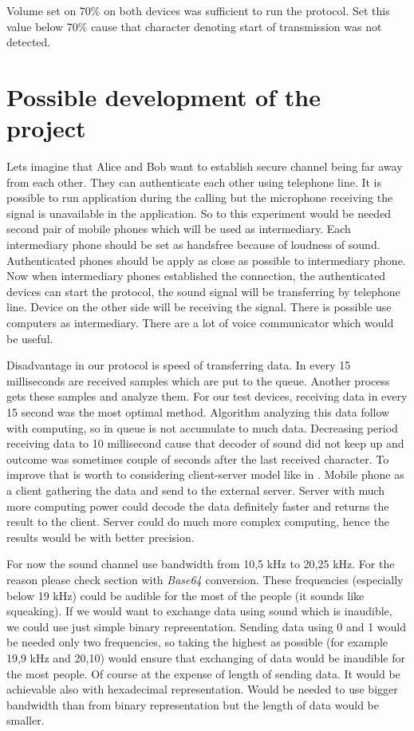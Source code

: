 \documentclass[11pt,titlepage]{article}
\theoremstyle{plain}
\begin{document}
Volume set on 70\% on both devices was sufficient to run the protocol. Set this value below 70\% cause that character denoting start of transmission was not detected.

\section{Possible development of the project}
Lets imagine that Alice and Bob want to establish secure channel being far away from each other. They can authenticate each other using telephone line. It is possible to run application during the calling but the microphone receiving the signal is unavailable in the application. So to this experiment would be needed second pair of mobile phones which will be used as intermediary. Each intermediary phone should be set as handsfree because of loudness of sound. Authenticated phones should be apply as close as possible to intermediary phone. Now when intermediary phones established the connection, the authenticated devices can start the protocol, the sound signal will be transferring by telephone line. Device on the other side will be receiving the signal. There is possible use computers as intermediary. There are a lot of voice communicator which would be useful.

\vspace{5mm}

Disadvantage in our protocol is speed of transferring data. In every 15 milliseconds are received samples which are put to the queue. Another process gets these samples and analyze them. For our test devices, receiving data in every 15 second was the most optimal method. Algorithm analyzing this data follow with computing, so in queue is not accumulate to much data. Decreasing period receiving data to 10 millisecond cause that decoder of sound did not keep up and outcome was sometimes couple of seconds after the last received character. To improve that is worth to considering client-server model like in \cite{chirp}. Mobile phone as a client gathering the data and send to the external server. Server with much more computing power could decode the data definitely faster and returns the result to the client. Server could do much more complex computing, hence the results would be with better precision.

\vspace{5mm}

For now the sound channel use bandwidth from 10,5 kHz to 20,25 kHz. For the reason please check section with \textit{Base64} conversion. These frequencies (especially below 19 kHz) could be audible for the most of the people (it sounds like squeaking). If we would want to exchange data using sound which is inaudible, we could use just simple binary representation. Sending data using 0 and 1 would be needed only two frequencies, so taking the highest as possible (for example 19,9 kHz and 20,10) would ensure that exchanging of data would be inaudible for the most people. Of course at the expense of length of sending data. It would be achievable also with hexadecimal representation. Would be needed to use bigger bandwidth than from binary representation but the length of data would be smaller.
\end{document}
